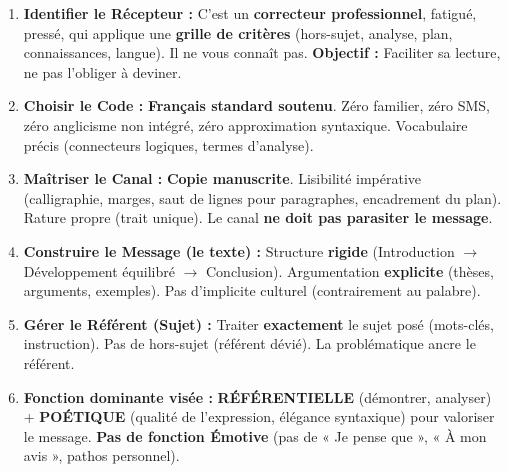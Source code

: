 \documentclass[11pt]{article}
\begin{document}
\begin{methode}
\begin{enumerate}
    \item \textbf{Identifier le Récepteur :} C'est un \textbf{correcteur professionnel}, fatigué, pressé, qui applique une \textbf{grille de critères} (hors-sujet, analyse, plan, connaissances, langue). Il ne vous connaît pas. \textbf{Objectif :} Faciliter sa lecture, ne pas l'obliger à deviner.
    \item \textbf{Choisir le Code :} \textbf{Français standard soutenu}. Zéro familier, zéro SMS, zéro anglicisme non intégré, zéro approximation syntaxique. Vocabulaire précis (connecteurs logiques, termes d'analyse).
    \item \textbf{Maîtriser le Canal :} \textbf{Copie manuscrite}. Lisibilité impérative (calligraphie, marges, saut de lignes pour paragraphes, encadrement du plan). Rature propre (trait unique). Le canal \textbf{ne doit pas parasiter le message}.
    \item \textbf{Construire le Message (le texte) :} Structure \textbf{rigide} (Introduction $\rightarrow$ Développement équilibré $\rightarrow$ Conclusion). Argumentation \textbf{explicite} (thèses, arguments, exemples). Pas d'implicite culturel (contrairement au palabre).
    \item \textbf{Gérer le Référent (Sujet) :} Traiter \textbf{exactement} le sujet posé (mots-clés, instruction). Pas de hors-sujet (référent dévié). La problématique ancre le référent.
    \item \textbf{Fonction dominante visée :} \textbf{RÉFÉRENTIELLE} (démontrer, analyser) + \textbf{POÉTIQUE} (qualité de l'expression, élégance syntaxique) pour valoriser le message. \textbf{Pas de fonction Émotive} (pas de « Je pense que », « À mon avis », pathos personnel).
\end{enumerate}
\end{methode}
\end{document}
